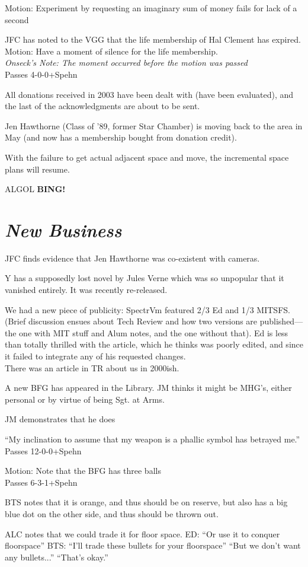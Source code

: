 \documentclass[10pt]{article}
\newcommand{\bing}{{\bf BING!} }
\newcommand{\goto}[1]{\bing \vskip 12pt \section*{{\em{#1}}}}
\begin{document}
Motion: Experiment by requesting an imaginary sum of money
fails for lack of a second

JFC has noted to the VGG that the life membership of Hal Clement has expired.\\
Motion: Have a moment of silence for the life membership.\\
\emph{Onseck's Note: The moment occurred before the motion was passed}\\
Passes 4-0-0+Spehn

All donations received in 2003 have been dealt with (have been
evaluated), and the last of the acknowledgments are about to be sent.

Jen Hawthorne (Class of '89, former Star Chamber) is moving back to
the area in May (and now has a membership bought from donation credit).

With the failure to get actual adjacent space and move, the
incremental space plans will resume.

ALGOL
\goto{New Business}

JFC finds evidence that Jen Hawthorne was co-existent with cameras.

Y has a supposedly lost novel by Jules Verne which was so unpopular
that it vanished entirely.  It was recently re-released.

We had a new piece of publicity: SpectrVm featured 2/3 Ed and 1/3
MITSFS.  (Brief discussion ensues about Tech Review and how two
versions are published---the one with MIT stuff and Alum notes, and
the one without that).
Ed is less than totally thrilled with the article, which he thinks was
poorly edited, and since it failed to integrate any of his requested
changes.\\
There was an article in TR about us in 2000ish.

A new BFG has appeared in the Library. JM thinks it might be MHG's,
either personal or by virtue of being Sgt. at Arms.

JM demonstrates that he does 

``My inclination to assume that my weapon is a phallic symbol has
betrayed me.''\\
Passes 12-0-0+Spehn

Motion: Note that the BFG has three balls\\
Passes 6-3-1+Spehn

BTS notes that it is orange, and thus should be on reserve, but also
has a big blue dot on the other side, and thus should be thrown out.

ALC notes that we could trade it for floor space.
ED: ``Or use it to conquer floorspace''
BTS: ``I'll trade these bullets for your floorspace''
     ``But we don't want any bullets...''
     ``That's okay.''
\end{document}
